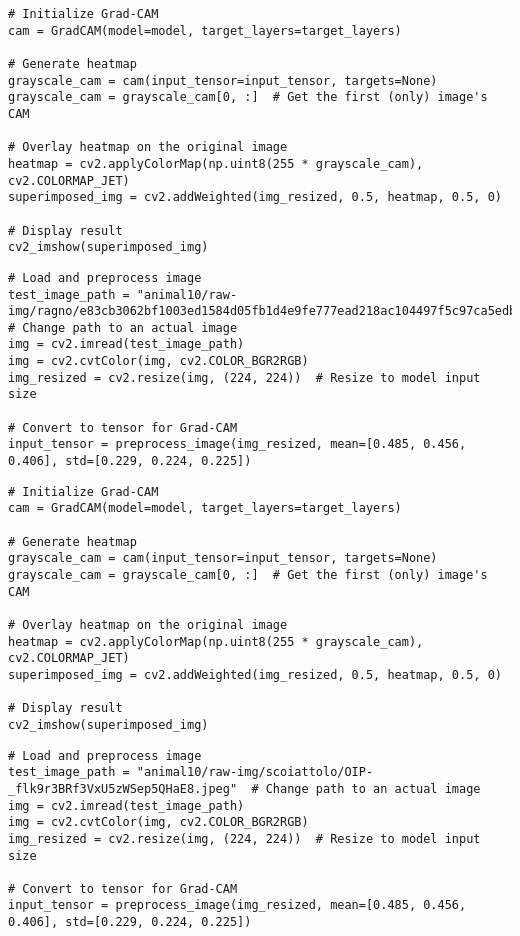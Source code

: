 \documentclass{article}
\begin{document}
\begin{verbatim}
# Initialize Grad-CAM
cam = GradCAM(model=model, target_layers=target_layers)

# Generate heatmap
grayscale_cam = cam(input_tensor=input_tensor, targets=None)
grayscale_cam = grayscale_cam[0, :]  # Get the first (only) image's CAM

# Overlay heatmap on the original image
heatmap = cv2.applyColorMap(np.uint8(255 * grayscale_cam), cv2.COLORMAP_JET)
superimposed_img = cv2.addWeighted(img_resized, 0.5, heatmap, 0.5, 0)

# Display result
cv2_imshow(superimposed_img)
\end{verbatim}

\begin{verbatim}
# Load and preprocess image
test_image_path = "animal10/raw-img/ragno/e83cb3062bf1003ed1584d05fb1d4e9fe777ead218ac104497f5c97ca5edb3bd_640.jpg"  # Change path to an actual image
img = cv2.imread(test_image_path)
img = cv2.cvtColor(img, cv2.COLOR_BGR2RGB)
img_resized = cv2.resize(img, (224, 224))  # Resize to model input size

# Convert to tensor for Grad-CAM
input_tensor = preprocess_image(img_resized, mean=[0.485, 0.456, 0.406], std=[0.229, 0.224, 0.225])
\end{verbatim}

\begin{verbatim}
# Initialize Grad-CAM
cam = GradCAM(model=model, target_layers=target_layers)

# Generate heatmap
grayscale_cam = cam(input_tensor=input_tensor, targets=None)
grayscale_cam = grayscale_cam[0, :]  # Get the first (only) image's CAM

# Overlay heatmap on the original image
heatmap = cv2.applyColorMap(np.uint8(255 * grayscale_cam), cv2.COLORMAP_JET)
superimposed_img = cv2.addWeighted(img_resized, 0.5, heatmap, 0.5, 0)

# Display result
cv2_imshow(superimposed_img)
\end{verbatim}

\begin{verbatim}
# Load and preprocess image
test_image_path = "animal10/raw-img/scoiattolo/OIP-_flk9r3BRf3VxU5zWSep5QHaE8.jpeg"  # Change path to an actual image
img = cv2.imread(test_image_path)
img = cv2.cvtColor(img, cv2.COLOR_BGR2RGB)
img_resized = cv2.resize(img, (224, 224))  # Resize to model input size

# Convert to tensor for Grad-CAM
input_tensor = preprocess_image(img_resized, mean=[0.485, 0.456, 0.406], std=[0.229, 0.224, 0.225])
\end{verbatim}
\end{document}
